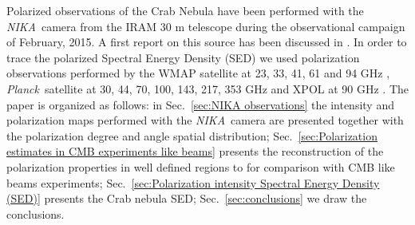 \documentclass[twocolumn,traditabstract]{aa}
\def\NIKA{\textit{NIKA}}
\def\Planck{\textit{Planck}}
\begin{document}
Polarized observations of the Crab Nebula have been performed with the \NIKA\ camera from the IRAM 30 m telescope during the observational campaign of February, 2015. A first report on this source has been discussed in \citep{2016JLTP..184..724R}.
In order to trace the polarized Spectral Energy Density (SED) we used polarization observations performed by the WMAP satellite at 23, 33, 41, 61 and 94 GHz \citep{2011ApJS..192...19W}, \Planck\ satellite at 30, 44, 70, 100, 143, 217, 353 GHz and XPOL at 90 GHz \citep{aumont2010}. 
 The paper is organized as follows: in Sec.~\ref{sec:NIKA observations} the intensity and polarization maps performed with the \NIKA\ camera
 are presented together with the polarization degree and angle spatial distribution; Sec.~\ref{sec:Polarization estimates in CMB experiments like beams} presents the reconstruction of the polarization properties in well defined regions to for comparison with CMB like beams experiments; Sec.~\ref{sec:Polarization intensity Spectral Energy Density (SED)} presents the Crab nebula SED; Sec.~\ref{sec:conclusions} we draw the conclusions.
\end{document}
